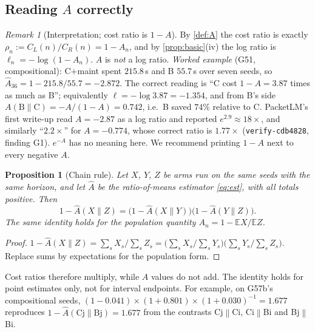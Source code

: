 \documentclass[11pt]{article}
\newtheorem{proposition}{Proposition}
\theoremstyle{remark}
\newtheorem{remark}{Remark}
\newcommand{\E}{\mathbb{E}}
\begin{document}
\subsection{Reading \texorpdfstring{$A$}{A} correctly}\label{sec:interp}
\begin{remark}[Interpretation; cost ratio is $1-A$]\label{rem:interp}
By \cref{def:A} the cost ratio is exactly $\rho_n := C_L(n)/C_R(n) = 1-A_n$, and by \cref{prop:basic}(iv) the log ratio is $\ell_n=-\log(1-A_n)$. $A$ is \emph{not} a log ratio. \emph{Worked example} (G51, compositional): C$+$maint spent $215.8$\,s and B $55.7$\,s over seven seeds, so $\hat A_{36} = 1-215.8/55.7 = -2.872$. The correct reading is ``C cost $1-A = 3.87$ times as much as B''; equivalently $\ell = -\log 3.87 = -1.354$, and from B's side $A(\text{B}\|\text{C}) = -A/(1-A) = 0.742$, i.e.\ B saved $74\%$ relative to C. PacketLM's first write-up read $A=-2.87$ as a log ratio and reported $e^{2.9}\approx 18\times$, and similarly ``$2.2\times$'' for $A=-0.774$, whose correct ratio is $1.77\times$ (\texttt{verify-cdb4828}, finding G1). $e^{-A}$ has no meaning here. We recommend printing $1-A$ next to every negative $A$.
\end{remark}

\begin{proposition}[Chain rule]\label{prop:chain}
Let $X$, $Y$, $Z$ be arms run on the same seeds with the same horizon, and let $\hat A$ be the ratio-of-means estimator \eqref{eq:est}, with all totals positive. Then
\[
1-\hat A(X\|Z) = \bigl(1-\hat A(X\|Y)\bigr)\bigl(1-\hat A(Y\|Z)\bigr).
\]
The same identity holds for the population quantity $A_n=1-\E X/\E Z$.
\end{proposition}
\begin{proof}
$1-\hat A(X\|Z)=\sum_s X_s/\sum_s Z_s = \bigl(\sum_s X_s/\sum_s Y_s\bigr)\bigl(\sum_s Y_s/\sum_s Z_s\bigr)$. Replace sums by expectations for the population form.
\end{proof}
Cost ratios therefore multiply, while $A$ values do not add. The identity holds for point estimates only, not for interval endpoints. For example, on G57b's compositional seeds, $(1-0.041)\times(1+0.801)\times(1+0.030)^{-1}=1.677$ reproduces $1-\hat A(\text{Cj}\|\text{Bj})=1.677$ from the contrasts Cj$\|$Ci, Ci$\|$Bi and Bj$\|$Bi.
\end{document}
